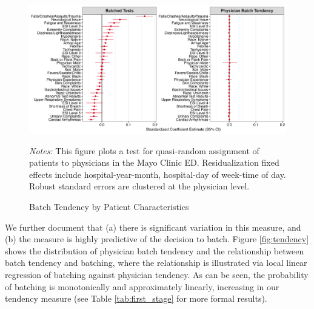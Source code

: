 \documentclass[,,nonblindrev]{informs}
\begin{document}
\begin{figure}[t]
\caption{Batch Tendency by Patient Characteristics}
\includegraphics[width=\textwidth]{../outputs/figures/fig2_panel_batched_standardized.png}
\label{fig:batch_tendency}
\begin{tablenotes}
\item \footnotesize \textit{Notes:} This figure plots a test for quasi-random assignment of patients to physicians in the Mayo Clinic ED. Residualization fixed effects include hospital-year-month, hospital-day of week-time of day. Robust standard errors are clustered at the physician level.
\end{tablenotes}
\end{figure}

We further document that (a) there is significant variation in this
measure, and (b) the measure is highly predictive of the decision to
batch. Figure \ref{fig:tendency} shows the distribution of physician
batch tendency and the relationship between batch tendency and batching,
where the relationship is illustrated via local linear regression of
batching against physician tendency. As can be seen, the probability of
batching is monotonically and approximately linearly, increasing in our
tendency measure (see Table \ref{tab:first_stage} for more formal
results).
\end{document}
